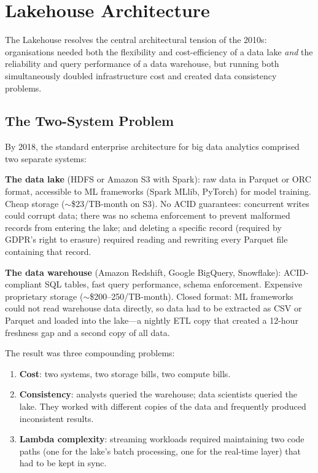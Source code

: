 \section{Lakehouse Architecture}
\label{sec:lakehouse}

The Lakehouse resolves the central architectural tension of the 2010s:
organisations needed both the flexibility and cost-efficiency of a data
lake \emph{and} the reliability and query performance of a data warehouse,
but running both simultaneously doubled infrastructure cost and created
data consistency problems.

\subsection{The Two-System Problem}
\label{subsec:two-system}

By 2018, the standard enterprise architecture for big data analytics
comprised two separate systems:

\textbf{The data lake} (HDFS or Amazon S3 with Spark): raw data in
Parquet or ORC format, accessible to ML frameworks (Spark MLlib, PyTorch)
for model training. Cheap storage ($\sim$\$23/TB-month on S3). No ACID
guarantees: concurrent writes could corrupt data; there was no schema
enforcement to prevent malformed records from entering the lake; and
deleting a specific record (required by GDPR's right to erasure) required
reading and rewriting every Parquet file containing that record.

\textbf{The data warehouse} (Amazon Redshift, Google BigQuery, Snowflake):
ACID-compliant SQL tables, fast query performance, schema enforcement.
Expensive proprietary storage ($\sim$\$200--250/TB-month). Closed format:
ML frameworks could not read warehouse data directly, so data had to be
extracted as CSV or Parquet and loaded into the lake---a nightly ETL
copy that created a 12-hour freshness gap and a second copy of all data.

The result was three compounding problems:
\begin{enumerate}
  \item \textbf{Cost}: two systems, two storage bills, two compute bills.
  \item \textbf{Consistency}: analysts queried the warehouse; data scientists
        queried the lake. They worked with different copies of the data
        and frequently produced inconsistent results.
  \item \textbf{Lambda complexity}: streaming workloads required maintaining
        two code paths (one for the lake's batch processing, one for the
        real-time layer) that had to be kept in sync.
\end{enumerate}

